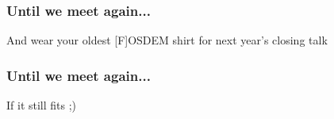 \documentclass[aspectratio=169]{beamer}
\begin{document}
\begin{frame}
	\frametitle{Until we meet again...}
	\vfill
	\begin{center}
		{\Huge And wear your oldest [F]OSDEM shirt for next year's closing talk}
	\end{center}
	\vfill
\end{frame}

\begin{frame}
	\frametitle{Until we meet again...}
	\vfill
	\begin{center}
		{\Huge If it still fits ;)}
	\end{center}
	\vfill
\end{frame}
\end{document}
